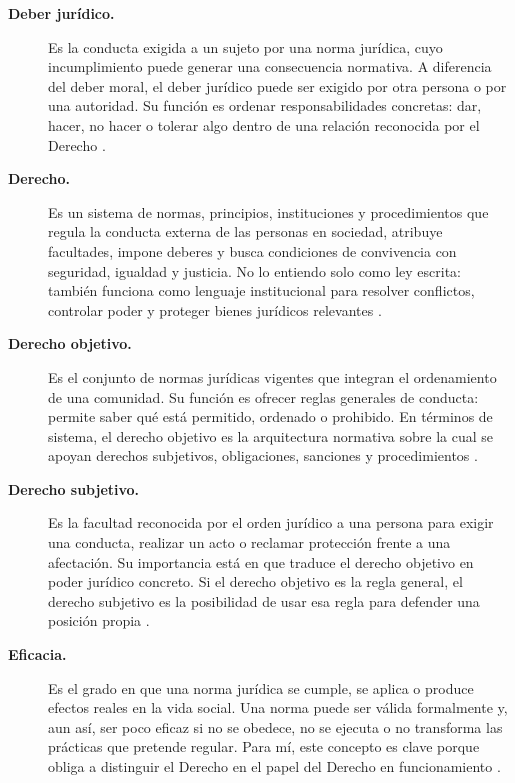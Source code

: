 \documentclass[
	spanish,
	letterpaper, oneside
]{article}
\begin{document}
\begin{description}
\item[\textbf{Deber jurídico.}]
Es la conducta exigida a un sujeto por una norma jurídica, cuyo incumplimiento puede generar una consecuencia normativa. A diferencia del deber moral, el deber jurídico puede ser exigido por otra persona o por una autoridad. Su función es ordenar responsabilidades concretas: dar, hacer, no hacer o tolerar algo dentro de una relación reconocida por el Derecho \citep{garciaMaynez2002,poderJudicialGto2007}.

\item[\textbf{Derecho.}]
Es un sistema de normas, principios, instituciones y procedimientos que regula la conducta externa de las personas en sociedad, atribuye facultades, impone deberes y busca condiciones de convivencia con seguridad, igualdad y justicia. No lo entiendo solo como ley escrita: también funciona como lenguaje institucional para resolver conflictos, controlar poder y proteger bienes jurídicos relevantes \citep{poderJudicialGto2007,rojas-gonzalezFilosofiaDerecho2018}.

\item[\textbf{Derecho objetivo.}]
Es el conjunto de normas jurídicas vigentes que integran el ordenamiento de una comunidad. Su función es ofrecer reglas generales de conducta: permite saber qué está permitido, ordenado o prohibido. En términos de sistema, el derecho objetivo es la arquitectura normativa sobre la cual se apoyan derechos subjetivos, obligaciones, sanciones y procedimientos \citep{garciaMaynez2002,poderJudicialGto2007}.

\item[\textbf{Derecho subjetivo.}]
Es la facultad reconocida por el orden jurídico a una persona para exigir una conducta, realizar un acto o reclamar protección frente a una afectación. Su importancia está en que traduce el derecho objetivo en poder jurídico concreto. Si el derecho objetivo es la regla general, el derecho subjetivo es la posibilidad de usar esa regla para defender una posición propia \citep{garciaMaynez2002,poderJudicialGto2007}.

\item[\textbf{Eficacia.}]
Es el grado en que una norma jurídica se cumple, se aplica o produce efectos reales en la vida social. Una norma puede ser válida formalmente y, aun así, ser poco eficaz si no se obedece, no se ejecuta o no transforma las prácticas que pretende regular. Para mí, este concepto es clave porque obliga a distinguir el Derecho en el papel del Derecho en funcionamiento \citep{garciaMaynez2002,launDerechoMoral2021}.


\end{description}
\end{document}
